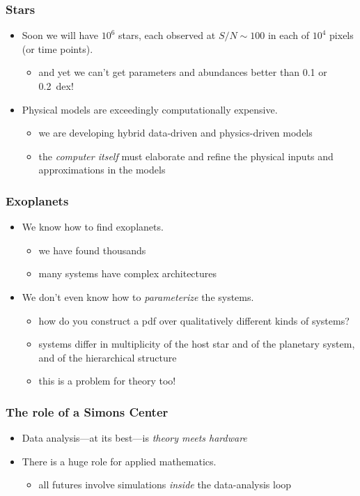 \documentclass[pdftex]{beamer}
\begin{document}
\begin{frame}
  \frametitle{Stars}
  \begin{itemize}
  \item Soon we will have $10^6$ stars, each observed at $S/N\sim 100$
    in each of $10^4$ pixels (or time points).
    \begin{itemize}
    \item and yet we can't get parameters and abundances better than 0.1 or 0.2~dex!
    \end{itemize}
  \item Physical models are exceedingly computationally expensive.
    \begin{itemize}
    \item we are developing hybrid data-driven and physics-driven models
    \item the \emph{computer itself} must elaborate and refine the
      physical inputs and approximations in the models
    \end{itemize}
  \end{itemize}
\end{frame}

\begin{frame}
  \frametitle{Exoplanets}
  \begin{itemize}
  \item We know how to find exoplanets.
    \begin{itemize}
    \item we have found thousands
    \item many systems have complex architectures
    \end{itemize}
  \item We don't even know how to \emph{parameterize} the systems.
    \begin{itemize}
    \item how do you construct a pdf over qualitatively different
      kinds of systems?
    \item systems differ in multiplicity of the host star and of the
      planetary system, and of the hierarchical structure
    \item this is a problem for theory too!
    \end{itemize}
  \end{itemize}
\end{frame}

\begin{frame}
  \frametitle{The role of a Simons Center}
  \begin{itemize}
  \item Data analysis---at its best---is \emph{theory meets hardware}
  \item There is a huge role for applied mathematics.
    \begin{itemize}
    \item all futures involve simulations \emph{inside} the
      data-analysis loop
    \end{itemize}
  \end{itemize}
\end{frame}
\end{document}

